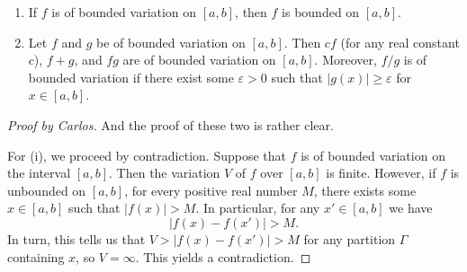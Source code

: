 \begin{theorem}[2.1]
\begin{enumerate}[label=\textnormal{(\roman*)}]
\item If $f$ is of bounded variation on $[a,b]$, then $f$ is bounded on
  $[a,b]$.
\item Let $f$ and $g$ be of bounded variation on $[a,b]$. Then $cf$ (for
  any real constant $c$), $f+g$, and $fg$ are of bounded variation on
  $[a,b]$. Moreover, $f/g$ is of bounded variation if there exist some
  $\varepsilon>0$ such that $|g(x)|\geq\varepsilon$ for $x\in[a,b]$.
\end{enumerate}
\end{theorem}
\begin{proof}[Proof by Carlos]
And the proof of these two is rather clear.

For (i), we proceed by contradiction. Suppose that $f$ is of bounded
variation on the interval $[a,b]$. Then the variation $V$ of $f$ over
$[a,b]$ is finite. However, if $f$ is unbounded on $[a,b]$, for every
positive real number $M$, there exists some $x\in[a,b]$ such that
$|f(x)|>M$. In particular, for any $x'\in [a,b]$ we have
\[
|f(x)-f(x')|>M.
\]
In turn, this tells us that $V>|f(x)-f(x')|>M$ for any partition $\Gamma$
containing $x$, so $V=\infty$. This yields a contradiction.


\end{proof}
